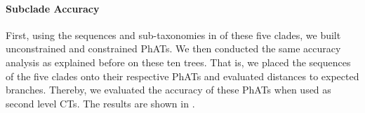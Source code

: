 \paragraph{Subclade Accuracy}
\label{ch:AutomaticTrees:sec:Evaluation:sub:MultilevelPlacement:par:SubcladeAccuracy}

First, using the sequences and sub-taxonomies in  of these five clades,
we built unconstrained and constrained \acp{PhAT}.
We then conducted the same accuracy analysis as explained before on these ten trees.
That is, we placed the  sequences of the five clades onto their respective \acp{PhAT}
and evaluated distances to expected branches.
Thereby, we evaluated the accuracy of these \acp{PhAT} when used as second level \aclp{CT}.
The results are shown in .

